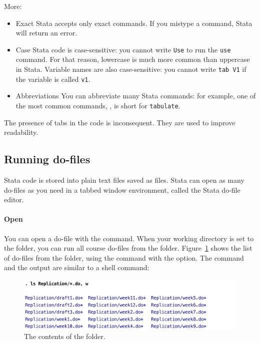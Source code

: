 More:

\begin{itemize}
	\item{Exact} Stata accepts only exact commands. If you mistype a command, Stata will return an error.

	\item{Case} Stata code is case-sensitive: you cannot write \texttt{Use} to run the \texttt{use} command. For that reason, lowercase is much more common than uppercase in Stata. Variable names are also case-sensitive: you cannot write \texttt{tab V1} if the variable is called \texttt{v1}.

	\item{Abbreviations} You can abbreviate many Stata commands: for example, one of the most common commands, , is short for \texttt{tabulate}.
\end{itemize}

The presence of tabs in the code is inconsequent. They are used to improve readability.

%
%
\subsection{Running do-files}%

Stata code is stored into plain text files saved as  files. Stata can open as many do-files as you need in a tabbed window environment, called the Stata do-file editor.

\paragraph{Open}%
%
You can open a do-file with the  command. When your working directory is set to the \SRQM folder, you can run all course do-files from the \code folder. Figure~\ref{fig:ls-replication} shows the list of do-files from the \code folder, using the  command with the  option. The command and the output are similar to a shell command:%

\begin{figure}[h]
	\includegraphics[scale=.5]{images/ls-replication}

	\caption{The contents of the \code folder.}%
    \label{fig:ls-replication}
\end{figure}

